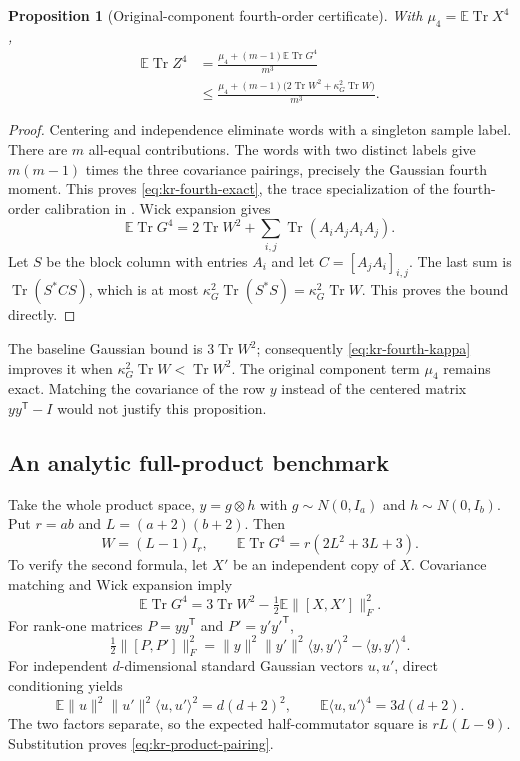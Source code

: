 \documentclass[11pt,a4paper]{article}
\newtheorem{proposition}[theorem]{Proposition}
\theoremstyle{definition}\newtheorem{definition}[theorem]{Definition}
\theoremstyle{remark}\newtheorem{remark}[theorem]{Remark}
\numberwithin{equation}{section}
\begin{document}
\begin{proposition}[Original-component fourth-order certificate]
\label{prop:kr-fourth}
With $\mu_4=\mathbb E\operatorname{Tr}X^4$,
\begin{align}
 \mathbb E\operatorname{Tr}Z^4
 &=\frac{\mu_4+(m-1)\mathbb E\operatorname{Tr}G^4}{m^3}
 \label{eq:kr-fourth-exact}\\
 &\le\frac{\mu_4+(m-1)
    \bigl(2\operatorname{Tr}W^2+\kappa_G^2\operatorname{Tr}W\bigr)}{m^3}.
 \label{eq:kr-fourth-kappa}
\end{align}
\end{proposition}

\begin{proof}
Centering and independence eliminate words with a singleton sample label.
There are $m$ all-equal contributions. The words with two distinct labels
give $m(m-1)$ times the three covariance pairings, precisely the Gaussian
fourth moment. This proves \eqref{eq:kr-fourth-exact}, the trace specialization
of the fourth-order calibration in \cite[Lemma 8.2]{GradedSource}.
Wick expansion gives
\[
 \mathbb E\operatorname{Tr}G^4
 =2\operatorname{Tr}W^2+
   \sum_{i,j}\operatorname{Tr}(A_iA_jA_iA_j).
\]
Let $S$ be the block column with entries $A_i$ and let
$C=[A_jA_i]_{i,j}$. The last sum is $\operatorname{Tr}(S^*CS)$,
which is at most $\kappa_G^2\operatorname{Tr}(S^*S)
=\kappa_G^2\operatorname{Tr}W$. This proves the bound directly.
\end{proof}

The baseline Gaussian bound is $3\operatorname{Tr}W^2$; consequently
\eqref{eq:kr-fourth-kappa} improves it when
$\kappa_G^2\operatorname{Tr}W<\operatorname{Tr}W^2$.
The original component term $\mu_4$ remains exact. Matching the covariance of
the row $y$ instead of the centered matrix $yy^{\mathsf T}-I$ would not
justify this proposition.

\subsection{An analytic full-product benchmark}

Take the whole product space, $y=g\otimes h$ with
$g\sim N(0,I_a)$ and $h\sim N(0,I_b)$. Put
$r=ab$ and $L=(a+2)(b+2)$. Then
\begin{equation}\label{eq:kr-product-pairing}
 W=(L-1)I_r,\qquad
 \mathbb E\operatorname{Tr}G^4=r(2L^2+3L+3).
\end{equation}
To verify the second formula, let $X'$ be an independent copy of $X$.
Covariance matching and Wick expansion imply
\[
 \mathbb E\operatorname{Tr}G^4
 =3\operatorname{Tr}W^2-\tfrac12\mathbb E\|[X,X']\|_F^2.
\]
For rank-one matrices $P=yy^{\mathsf T}$ and $P'=y'y'^{\mathsf T}$,
\[
 \tfrac12\|[P,P']\|_F^2
 =\|y\|^2\|y'\|^2\langle y,y'\rangle^2-\langle y,y'\rangle^4.
\]
For independent $d$-dimensional standard Gaussian vectors $u,u'$, direct
conditioning yields
\[
 \mathbb E\|u\|^2\|u'\|^2\langle u,u'\rangle^2=d(d+2)^2,
 \qquad \mathbb E\langle u,u'\rangle^4=3d(d+2).
\]
The two factors separate, so the expected half-commutator square is
$rL(L-9)$. Substitution proves \eqref{eq:kr-product-pairing}.
\end{document}
